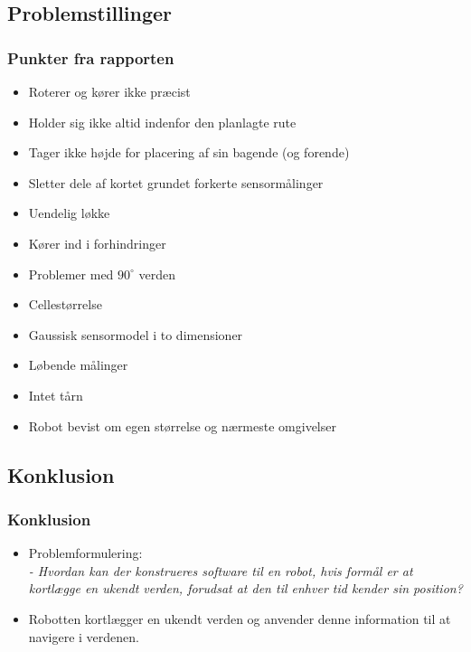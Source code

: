 \subsection{Problemstillinger}

\begin{frame}
\frametitle{Punkter fra rapporten}
\begin{itemize}
\item Roterer og kører ikke præcist
\item Holder sig ikke altid indenfor den planlagte rute
\item Tager ikke højde for placering af sin bagende (og forende)
\item Sletter dele af kortet grundet forkerte sensormålinger
\item Uendelig løkke
\item Kører ind i forhindringer
\item Problemer med $90^\circ$ verden
\item Cellestørrelse
\item Gaussisk sensormodel i to dimensioner
\item Løbende målinger
\item Intet tårn
\item Robot bevist om egen størrelse og nærmeste omgivelser
\end{itemize}
\end{frame}


\subsection{Konklusion}

\begin{frame}
\frametitle{Konklusion}
\begin{itemize}
\item Problemformulering:\\
\textit{- Hvordan kan der konstrueres software til en robot, hvis formål er at kortlægge en ukendt verden, forudsat at den til enhver tid kender sin position?}
\pause
\item Robotten kortlægger en ukendt verden og anvender denne information til at navigere i verdenen.
\end{itemize}
\end{frame}